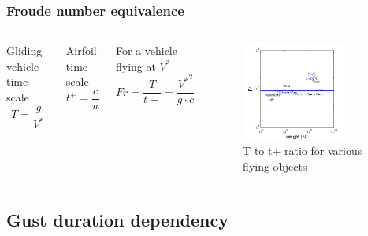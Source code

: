 \documentclass[compress]{beamer}
\begin{document}
\begin{frame}
  \frametitle{Froude number equivalence}
  \begin{columns}
    Gliding vehicle time scale
    \begin{equation*}
      T=\frac{g}{V^*}
    \end{equation*}

    Airfoil time scale
    \begin{equation*}
      t^+=\frac{c}{u}
    \end{equation*}

    For a vehicle flying at $V^*$
    \begin{equation*}
      Fr=\frac{T}{t+}=\frac{{V^*}^2}{g \cdot c}
      \label{eqn:T_t+_ratio}
    \end{equation*}

    \begin{figure}[h]
      \begin{center}
	\includegraphics[width=0.8\textwidth]{./Figures/froude.png}
      \end{center}
      \caption{T to t+ ratio for various flying objects}
    \end{figure}
  \end{columns}
\end{frame}
\subsection{Gust duration dependency}
\end{document}
